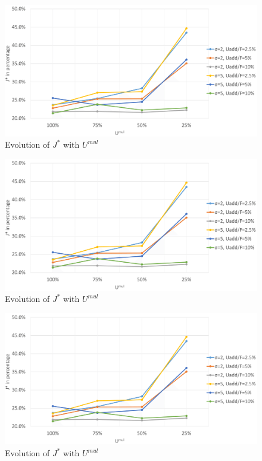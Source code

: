 \begin{figure}
	\label{fig:umul}
	\caption{Evolution of $J^{*}$ with $U^{mul}$}
	\includegraphics[width=7in]{figures/umul.png}
\end{figure}
\begin{figure}
	\label{fig:umul}
	\caption{Evolution of $J^{*}$ with $U^{mul}$}
	\includegraphics[width=7in]{figures/umul.png}
\end{figure}	
\begin{figure}
	\label{fig:umul}
	\caption{Evolution of $J^{*}$ with $U^{mul}$}
	\includegraphics[width=7in]{figures/umul.png}
\end{figure}